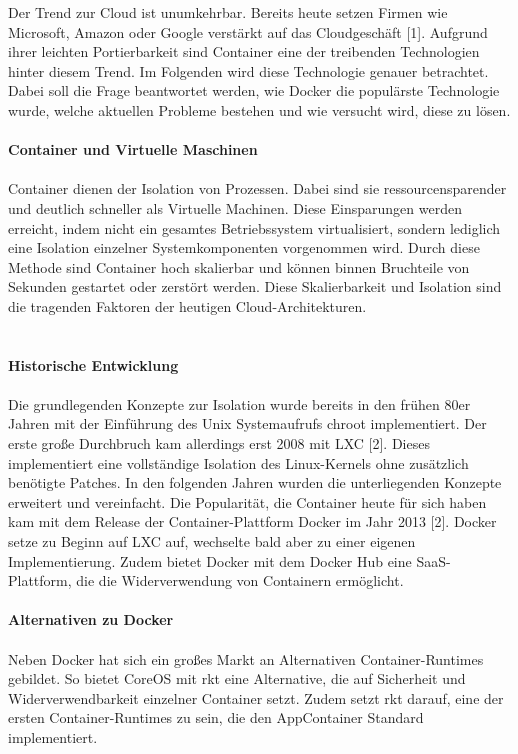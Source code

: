 \begin{multicols}{2}
Der Trend zur Cloud ist unumkehrbar. Bereits heute setzen Firmen wie Microsoft, Amazon oder Google verstärkt auf das Cloudgeschäft [1]. Aufgrund ihrer leichten Portierbarkeit sind Container eine der treibenden Technologien hinter diesem Trend. Im Folgenden wird diese Technologie genauer betrachtet. Dabei soll die Frage beantwortet werden, wie Docker die populärste Technologie wurde, welche aktuellen Probleme bestehen und wie versucht wird, diese zu lösen.
\\
\\ \textbf{Container und Virtuelle Maschinen}
\\
\\
Container dienen der Isolation von Prozessen. Dabei sind sie ressourcensparender und deutlich schneller als Virtuelle Machinen. Diese Einsparungen werden erreicht, indem nicht ein gesamtes Betriebssystem virtualisiert, sondern lediglich eine Isolation einzelner Systemkomponenten vorgenommen wird.
\bildbreit
\bildI
\bildschmal
Durch diese Methode sind Container hoch skalierbar und können binnen Bruchteile von Sekunden gestartet oder zerstört werden. Diese Skalierbarkeit und Isolation sind die tragenden Faktoren der heutigen Cloud-Architekturen.
\\
\\
\\
\textbf{Historische Entwicklung}
\\
\\
Die grundlegenden Konzepte zur Isolation wurde bereits in den frühen 80er Jahren mit der Einführung des Unix Systemaufrufs chroot implementiert. Der erste große Durchbruch kam allerdings erst 2008 mit LXC [2]. Dieses implementiert eine vollständige Isolation des Linux-Kernels ohne zusätzlich benötigte Patches.
\bildbreit
\bildII
\bildschmal
In den folgenden Jahren wurden die unterliegenden Konzepte erweitert und vereinfacht. Die Popularität, die Container heute für sich haben kam mit dem Release der Container-Plattform Docker im Jahr 2013 [2]. Docker setze zu Beginn auf LXC auf, wechselte bald aber zu einer eigenen Implementierung. Zudem bietet Docker mit dem Docker Hub eine SaaS-Plattform, die die Widerverwendung von Containern ermöglicht. 
\\
\\ \textbf{Alternativen zu Docker}
\\
\\
Neben Docker hat sich ein großes Markt an Alternativen Container-Runtimes gebildet. So bietet CoreOS mit rkt eine Alternative, die auf Sicherheit und Widerverwendbarkeit einzelner Container setzt. Zudem setzt rkt darauf, eine der ersten Container-Runtimes zu sein, die den AppContainer Standard implementiert.

\end{multicols}
